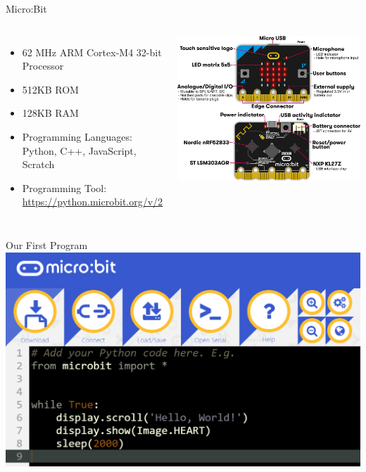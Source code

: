 \documentclass[handout]{beamer}
\begin{document}
\begin{frame}{Micro:Bit}
    \begin{columns}
    \begin{itemize}
        \item 62 MHz ARM Cortex-M4 32-bit Processor
        \item 512KB ROM
        \item 128KB RAM
        \item Programming Languages: Python, C++, JavaScript, Scratch
        \item Programming Tool: \url{https://python.microbit.org/v/2}
    \end{itemize}
    \includegraphics[width=\textwidth]{images/microbit-overview-2}
    \end{columns}    
\end{frame}

\begin{frame}{Our First Program}
    \includegraphics[max width=\textwidth, max height=\textheight]{images/prog1}
\end{frame}
\end{document}
